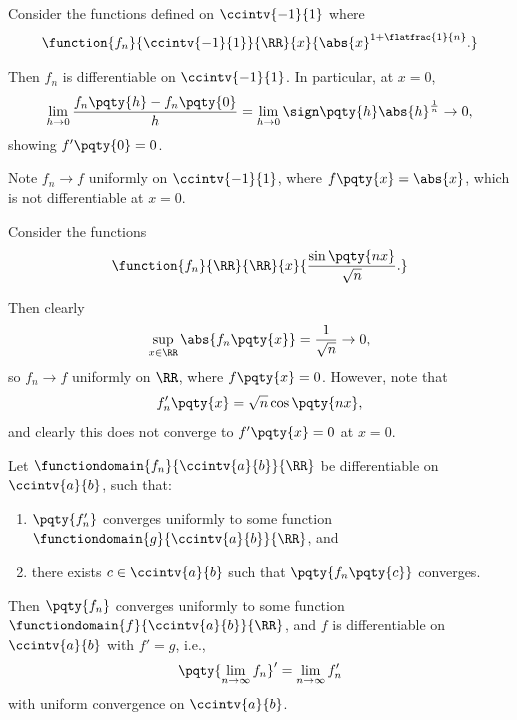 \begin{example}
    Consider the functions defined on \(\ccintv{-1}{1}\) where
    \[
        \function{f_n}{\ccintv{-1}{1}}{\RR}{x}{\abs{x}^{1 + \flatfrac{1}{n}}.}
    \]

    Then \(f_n\) is differentiable on \(\ccintv{-1}{1}\). In particular, at \(x = 0\),
    \[
        \lim_{h \to 0} \frac{f_n\pqty{h} - f_n\pqty{0}}{h} = \lim_{h \to 0} \sign\pqty{h} \abs{h}^{\frac{1}{n}} \to 0,
    \]
    showing \(f'\pqty{0} = 0\).

    Note \(f_n \to f\) uniformly on \(\ccintv{-1}{1}\), where \(f\pqty{x} = \abs{x}\), which is not differentiable at \(x = 0\).
\end{example}

\begin{example}
    Consider the functions
    \[
        \function{f_n}{\RR}{\RR}{x}{\frac{\sin\pqty{nx}}{\sqrt{n}}.}
    \]

    Then clearly
    \[
        \sup_{x \in \RR} \abs{f_n\pqty{x}} = \frac{1}{\sqrt{n}} \to 0,
    \]
    so \(f_n \to f\) uniformly on \(\RR\), where \(f\pqty{x} = 0\). However, note that
    \[
        f_n'\pqty{x} = \sqrt{n} \cos\pqty{nx},
    \]
    and clearly this does not converge to \(f'\pqty{x} = 0\) at \(x = 0\).
\end{example}

\begin{theorem}
    \label{thm:uniform-convergence-differentiability}%
    Let \(\functiondomain{f_n}{\ccintv{a}{b}}{\RR}\) be differentiable on \(\ccintv{a}{b}\), such that:
    \begin{enumerate}[label=(\roman*)]
        \item \(\pqty{f_n'}\) converges uniformly to some function \(\functiondomain{g}{\ccintv{a}{b}}{\RR}\), and
        \item there exists \(c \in \ccintv{a}{b}\) such that \(\pqty{f_n\pqty{c}}\) converges.
    \end{enumerate}

    Then \(\pqty{f_n}\) converges uniformly to some function \(\functiondomain{f}{\ccintv{a}{b}}{\RR}\), and \(f\) is differentiable on \(\ccintv{a}{b}\) with \(f' = g\), i.e.,
    \[
        \pqty{\lim_{n \to \infty} f_n}' = \lim_{n \to \infty} f_n'
    \]
    with uniform convergence on \(\ccintv{a}{b}\).
\end{theorem}

